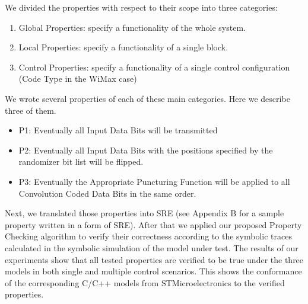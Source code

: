\documentclass[submission,copyright,creativecommons]{eptcs}
\begin{document}
We divided the properties with respect to their scope into three categories: \begin{enumerate}
  \item Global Properties: specify a functionality of the whole system.
  \item Local Properties: specify a functionality of a single block.
  \item Control Properties: specify a functionality of a single control configuration (Code Type in the WiMax case)
\end{enumerate}
We wrote several properties of each of these main categories. Here we describe three of them. \begin{itemize}
  \item P1: Eventually all Input Data Bits will be transmitted
  \item P2: Eventually all Input Data Bits with the positions specified by the randomizer bit list will be flipped.
  \item P3: Eventually the Appropriate Puncturing Function will be applied to all Convolution Coded Data Bits in the same order.
\end{itemize}
Next, we translated those properties into SRE (see Appendix B for a sample property written in a form of SRE). After that we applied our proposed Property Checking algorithm to verify their correctness according to the symbolic traces calculated in the symbolic simulation of the model under test. The results of our experiments show that all tested properties are verified to be true under the three models in both single and multiple control scenarios. This shows the conformance of the corresponding C/C++ models from STMicroelectronics to the verified properties.
\end{document}

